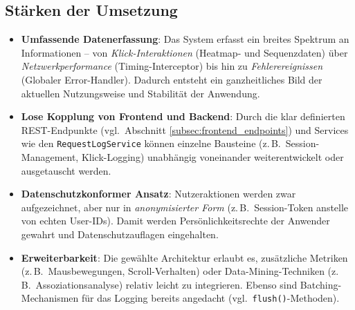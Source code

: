 \documentclass[12pt,oneside]{article}
\begin{document}
\subsection{Stärken der Umsetzung}
\begin{itemize}
    \item \textbf{Umfassende Datenerfassung}:
    Das System erfasst ein breites Spektrum an Informationen – von \emph{Klick-Interaktionen} (Heatmap- und Sequenzdaten) über \emph{Netzwerkperformance} (Timing-Interceptor) bis hin zu \emph{Fehlerereignissen} (Globaler Error-Handler). Dadurch entsteht ein ganzheitliches Bild der aktuellen Nutzungsweise und Stabilität der Anwendung.
    \item \textbf{Lose Kopplung von Frontend und Backend}:
    Durch die klar definierten REST-Endpunkte (vgl.\ Abschnitt \ref{subsec:frontend_endpoints}) und Services wie den \texttt{RequestLogService} können einzelne Bausteine (z.\,B.\ Session-Management, Klick-Logging) unabhängig voneinander weiterentwickelt oder ausgetauscht werden.
    \item \textbf{Datenschutzkonformer Ansatz}:
    Nutzeraktionen werden zwar aufgezeichnet, aber nur in \emph{anonymisierter Form} (z.\,B.\ Session-Token anstelle von echten User-IDs). Damit werden Persönlichkeitsrechte der Anwender gewahrt und Datenschutzauflagen eingehalten.
    \item \textbf{Erweiterbarkeit}:
    Die gewählte Architektur erlaubt es, zusätzliche Metriken (z.\,B.\ Mausbewegungen, Scroll-Verhalten) oder Data-Mining-Techniken (z.\,B.\ Assoziationsanalyse) relativ leicht zu integrieren. Ebenso sind Batching-Mechanismen für das Logging bereits angedacht (vgl.\ \texttt{flush()}-Methoden).
\end{itemize}
\end{document}
